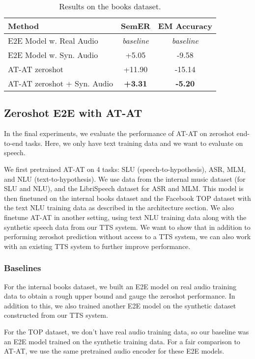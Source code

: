 \documentclass[letterpaper]{article} \usepackage{aaai21}  \usepackage{times}  \usepackage{helvet} \usepackage{courier}  \usepackage[hyphens]{url}  \usepackage{graphicx} \usepackage{booktabs}
\begin{document}
\begin{table}
\begin{tabular}{lcc}
\toprule
\bf Method & \bf{SemER} & \bf{EM Accuracy} \\
\midrule
E2E Model w. Real Audio & \emph{baseline} & \emph{baseline} \\
\midrule
E2E Model w. Syn. Audio & +5.05 & -9.58 \\
AT-AT zeroshot & +11.90 & -15.14 \\
AT-AT zeroshot + Syn. Audio & \bf +3.31 & \bf -5.20 \\
\bottomrule
\end{tabular}
\caption{
    Results on the books dataset. 
}
\label{tab:books}
\end{table}


\subsection{Zeroshot E2E with AT-AT}
In the final experiments, we evaluate the performance of AT-AT on zeroshot end-to-end tasks. Here, we only have text training data and we want to evaluate on speech.

We first pretrained AT-AT on 4 tasks: SLU (speech-to-hypothesis), ASR, MLM, and NLU (text-to-hypothesis). We use data from the internal music dataset (for SLU and NLU), and the LibriSpeech dataset for ASR and MLM. This model is then finetuned on the internal books dataset and the Facebook TOP dataset with the text NLU training data as described in the architecture section. We also finetune AT-AT in another setting, using text NLU training data along with the synthetic speech data from our TTS system. We want to show that in addition to performing zeroshot prediction without access to a TTS system, we can also work with an existing TTS system to further improve performance. 

\subsubsection{Baselines}
For the internal books dataset, we built an E2E model on real audio training data to obtain a rough upper bound and gauge the zeroshot performance. In addition to this, we also trained another E2E model on the synthetic dataset constructed from our TTS system. 

For the TOP dataset, we don't have real audio training data, so our baseline was an E2E model trained on the synthetic training data. For a fair comparison to AT-AT, we use the same pretrained audio encoder for these E2E models.
\end{document}
